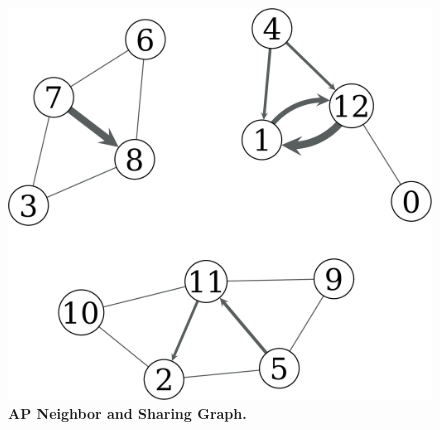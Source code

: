 \begin{figure}[t]
  \centering
  \includegraphics[width=\columnwidth]{./figures/HomeAPNeighborFigure.pdf}
  \caption{\textbf{AP Neighbor and Sharing Graph.}}
  \label{fig:reciprocal}
\end{figure}



\newpage
\clearpage

